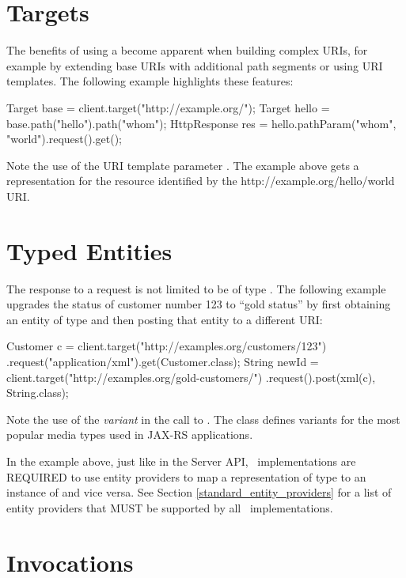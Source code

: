 \section{Targets}

The benefits of using a  become apparent when building complex URIs, for example by extending base URIs with additional path segments or using URI templates. The following example highlights these features:

\begin{listing}{1}
Target base = client.target("http://example.org/");
Target hello = base.path("hello").path("{whom}");   
HttpResponse res = hello.pathParam("whom", "world").request().get();
\end{listing}

Note the use of the URI template parameter . The example above gets a representation for the resource identified by the http://example.org/hello/world URI.

\section{Typed Entities}

The response to a request is not limited to be of type \HttpResponse. The following example upgrades the status of customer number 123 to ``gold status'' by first obtaining an entity of type  and then posting that entity to a different URI:

\begin{listing}{1}
Customer c = client.target("http://examples.org/customers/123")
    .request("application/xml").get(Customer.class);
String newId = client.target("http://examples.org/gold-customers/")
    .request().post(xml(c), String.class);
\end{listing}

Note the use of the {\em variant}  in the call to . The class  defines variants for the most popular media types used in JAX-RS applications.

In the example above, just like in the Server API, \jaxrs\ implementations are REQUIRED to use entity providers to map a representation of type  to an instance of  and vice versa. See Section \ref{standard_entity_providers} for a list of entity providers that MUST be supported by all \jaxrs\ implementations.

\section{Invocations}
\label{invocations}

